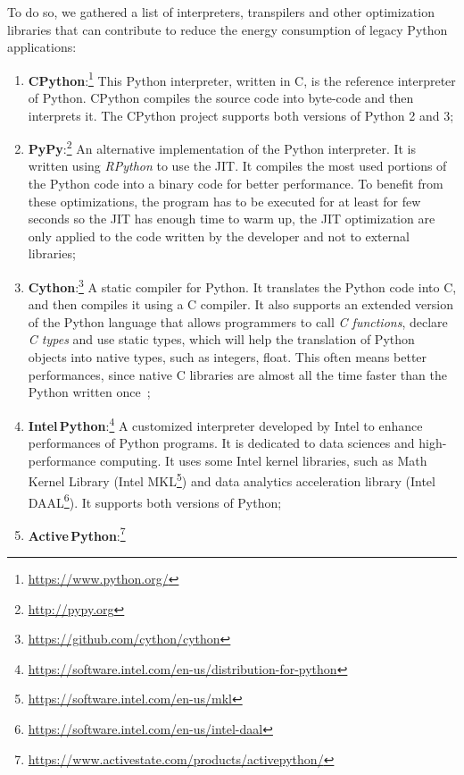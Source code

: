 To do so, we gathered a list of interpreters, transpilers and other optimization libraries that can contribute to reduce the energy consumption of legacy Python applications:
\begin{enumerate}
      \item \textbf{CPython}:\footnote{\url{https://www.python.org/}}
            This Python interpreter, written in C, is the reference interpreter of Python.
            CPython compiles the source code into byte-code and then interprets it.
            The CPython project supports both versions of Python 2 and 3;
      \item \textbf{PyPy}:\footnote{\url{http://pypy.org}}
            An alternative implementation of the Python interpreter.
            It is written using \emph{RPython} to use the JIT.
            It compiles the most used portions of the Python code into a binary code for better performance.
            To benefit from these optimizations, the program has to be executed for at least for few seconds so the JIT has enough time to warm up, the JIT optimization are only applied to the code written by the developer and not to external libraries;
      \item \textbf{Cython}:\footnote{\url{https://github.com/cython/cython}}
            A static compiler for Python.
            It translates the Python code into C, and then compiles it using a C compiler.
            It also supports an extended version of the Python language that allows programmers to call \emph{C functions}, declare \emph{C types} and use static types, which will help the translation of Python objects into native types, such as integers, float.
            This often means better performances, since native C libraries are almost all the time faster than the Python written once~\cite{pereira_energy_2017};
      \item \textbf{Intel\,Python}:\footnote{\url{https://software.intel.com/en-us/distribution-for-python}}
            A customized interpreter developed by Intel to enhance performances of Python programs.
            It is dedicated to data sciences and high-performance computing.
            It uses some Intel kernel libraries, such as Math Kernel Library (Intel MKL\footnote{\url{https://software.intel.com/en-us/mkl}}) and data analytics acceleration library (Intel DAAL\footnote{\url{https://software.intel.com/en-us/intel-daal}}).
            It supports both versions of Python;
      \item \textbf{Active\,Python}:\footnote{\url{https://www.activestate.com/products/activepython/}}

\end{enumerate}
